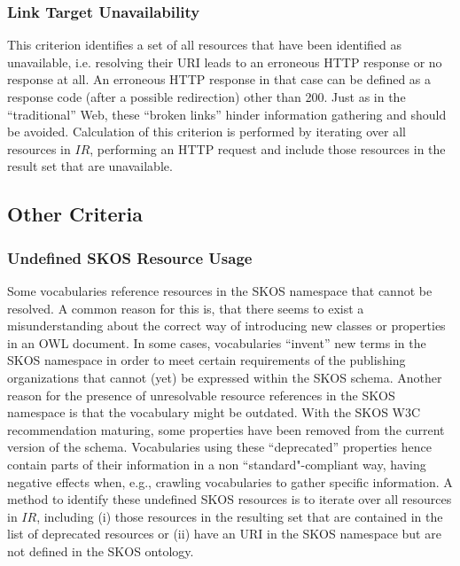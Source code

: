 
\subsubsection{Link Target Unavailability}
This criterion identifies a set of all resources that have been identified as unavailable, i.e. resolving their URI leads to an erroneous HTTP response or no response at all. An erroneous HTTP response in that case can be defined as a response code (after a possible redirection) other than 200. Just as in the ``traditional'' Web, these ``broken links'' hinder information gathering and should be avoided. Calculation of this criterion is performed by iterating over all resources in $IR$, performing an HTTP request and include those resources in the result set that are unavailable.


\subsection{Other Criteria}

\subsubsection{Undefined SKOS Resource Usage}
Some vocabularies reference resources in the SKOS namespace that cannot be resolved. A common reason for this is, that there seems to exist a misunderstanding about the correct way of introducing new classes or properties in an OWL document. In some cases, vocabularies ``invent'' new terms in the SKOS namespace in order to meet certain requirements of the publishing organizations that cannot (yet) be expressed within the SKOS schema. Another reason for the presence of unresolvable resource references in the SKOS namespace is that the vocabulary might be outdated. With the SKOS W3C recommendation maturing, some properties have been removed from the current version of the schema. Vocabularies using these ``deprecated'' properties hence contain parts of their information in a non ``standard"-compliant way, having negative effects when, e.g., crawling vocabularies to gather specific information. A method to identify these undefined SKOS resources is to iterate over all resources in $IR$, including (i) those resources in the resulting set that are contained in the list of deprecated resources or (ii) have an URI in the SKOS namespace but are not defined in the SKOS ontology. 

